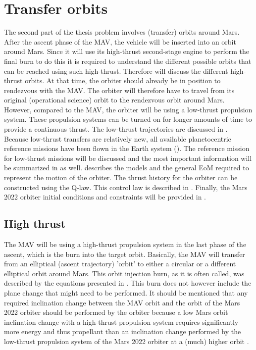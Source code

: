 \chapter{Transfer orbits} %
\label{ch:transorb}
The second part of the thesis problem involves (transfer) orbits around Mars. After the ascent phase of the \ac{MAV}, the vehicle will be inserted into an orbit around Mars. Since it will use its high-thrust second-stage engine to perform the final burn to do this it is required to understand the different possible orbits that can be reached using such high-thrust. Therefore  will discuss the different high-thrust orbits. At that time, the orbiter should already be in position to rendezvous with the \ac{MAV}. The orbiter will therefore have to travel from its original (operational science) orbit to the rendezvous orbit around Mars. However, compared to the \ac{MAV}, the orbiter will be using a low-thrust propulsion system. These propulsion systems can be turned on for longer amounts of time to provide a continuous thrust. The low-thrust trajectories are discussed in . Because low-thrust transfers are relatively new, all available planetocentric reference missions have been flown in the Earth system (). The reference mission for low-thrust missions will be discussed and the most important information will be summarized in  as well.  describes the models and the general \ac{EoM} required to represent the motion of the orbiter. The thrust history for the orbiter can be constructed using the Q-law. This control law is described in . Finally, the Mars 2022 orbiter initial conditions and constraints will be provided in .



\section{High thrust}
\label{sec:highthrustorb}
The \ac{MAV} will be using a high-thrust propulsion system in the last phase of the ascent, which is the burn into the target orbit. Basically, the \ac{MAV} will transfer from an elliptical (ascent trajectory) 'orbit' to either a circular or a different elliptical orbit around Mars. This orbit injection burn, as it is often called, was described by the equations presented in . This burn does not however include the plane change that might need to be performed. It should be mentioned that any required inclination change between the \ac{MAV} orbit and the orbit of the Mars 2022 orbiter should be performed by the orbiter because a low Mars orbit inclination change with a high-thrust propulsion system requires significantly more energy and thus propellant than an inclination change performed by the low-thrust propulsion system of the Mars 2022 orbiter at a (much) higher orbit \cite{wakker2010}. 

